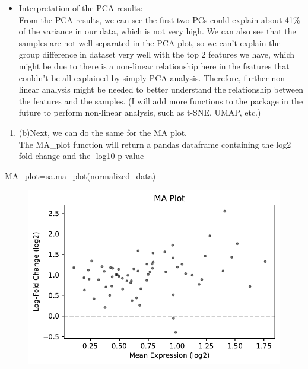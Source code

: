 \documentclass[
  letterpaper,
  DIV=11,
  numbers=noendperiod]{scrartcl}
\newenvironment{Shaded}{\begin{snugshade}}{\end{snugshade}}
\newcommand{\NormalTok}[1]{\textcolor[rgb]{0.00,0.23,0.31}{#1}}
\newcommand{\OperatorTok}[1]{\textcolor[rgb]{0.37,0.37,0.37}{#1}}
\providecommand{\tightlist}{%
  \setlength{\itemsep}{0pt}\setlength{\parskip}{0pt}}\usepackage{longtable,booktabs,array}
\begin{document}
\begin{itemize}
\tightlist
\item
  Interpretation of the PCA results:\\
  From the PCA results, we can see the first two PCs could explain about
  41\% of the variance in our data, which is not very high. We can also
  see that the samples are not well separated in the PCA plot, so we
  can't explain the group difference in dataset very well with the top 2
  features we have, which might be due to there is a non-linear
  relationship here in the features that couldn't be all explained by
  simply PCA analysis. Therefore, further non-linear analysis might be
  needed to better understand the relationship between the features and
  the samples. (I will add more functions to the package in the future
  to perform non-linear analysis, such as t-SNE, UMAP, etc.)\\
\end{itemize}

\begin{enumerate}
\def\labelenumi{\arabic{enumi}.}
\setcounter{enumi}{2}
\tightlist
\item
  (b)Next, we can do the same for the MA plot.\\
  The MA\_plot function will return a pandas dataframe containing the
  log2 fold change and the -log10 p-value\\
\end{enumerate}

\begin{Shaded}
\begin{Highlighting}[]
\NormalTok{MA\_plot}\OperatorTok{=}\NormalTok{sa.ma\_plot(normalized\_data)}
\end{Highlighting}
\end{Shaded}

\begin{figure}[H]

{\centering \includegraphics{tutorial_files/figure-pdf/perform_ma_plot-output-1.pdf}

}

\end{figure}
\end{document}
